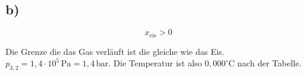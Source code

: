

\subsection*{b)}

\[ x_{\text{eis}} > 0 \]

Die Grenze die das Gas verläuft ist die gleiche wie das Eis. \( p_{3,2} = 1,4 \cdot 10^5 \, \text{Pa} = 1,4 \, \text{bar} \). Die Temperatur ist also \( 0,000^\circ \text{C} \) nach der Tabelle.